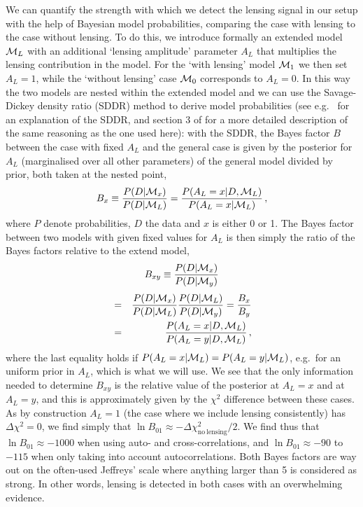 We can quantify the strength with which we detect the lensing signal in our setup with the help of Bayesian model probabilities, comparing the case with lensing to the case without lensing. To do this, we introduce formally an extended model ${\mathcal M}_L$ with an additional `lensing amplitude' parameter $A_L$ that multiplies the lensing contribution in the model. For the `with lensing' model ${\mathcal M}_1$ we then set $A_L = 1$, while the `without lensing' case ${\mathcal M}_0$ corresponds to $A_L=0$. In this way the two models are nested within the extended model and we can use the Savage-Dickey density ratio (SDDR) method to derive model probabilities (see e.g.\ \cite{Trotta:2005ar} for an explanation of the SDDR, and section 3 of \cite{Dirian:2016puz} for a more detailed description of the same reasoning as the one used here): with the SDDR, the Bayes factor $B$ between the case with fixed $A_L$ and the general case is given by the posterior for $A_L$ (marginalised over all other parameters) of the general model divided by prior, both taken at the nested point,
\begin{equation}
B_x \equiv \frac{P(D|{\mathcal M}_x)}{P(D|{\mathcal M}_L)} = \frac{P(A_L=x|D,{\mathcal M}_L)}{P(A_L=x|{\mathcal M}_L)} \, ,
\end{equation}
where $P$ denote probabilities, $D$ the data and $x$ is either 0 or 1.
The Bayes factor between two models with given fixed values for $A_L$ is then simply the ratio of the Bayes factors relative to the extend model, 
\begin{equation}
B_{xy} \equiv \frac{P(D|{\mathcal M}_x)}{P(D|{\mathcal M}_y)} \nonumber
\end{equation}
\begin{eqnarray}
&=& \frac{P(D|{\mathcal M}_x)}{P(D|{\mathcal M}_L)} \frac{P(D|{\mathcal M}_L)}{P(D|{\mathcal M}_y)} = \frac{B_x}{B_y} \nonumber \\
 &=& \frac{P(A_L=x|D,{\mathcal M}_L)}{P(A_L=y|D,{\mathcal M}_L)} \, ,
\end{eqnarray}
where the last equality holds if $P(A_L=x|{\mathcal M}_L)=P(A_L=y|{\mathcal M}_L)$, e.g.\ for an uniform prior in $A_L$, which is what we will use. We see that the only information needed to determine $B_{xy}$ is the relative value of the posterior at $A_L=x$ and at $A_L=y$, and this is approximately given by the $\chi^2$ difference between these cases. As by construction $A_L=1$ (the case where we include lensing consistently) has $\Delta\chi^2=0$, we find simply that $\ln B_{01} \approx -\Delta\chi^2_{\mathrm{no~lensing}}/2$. We find thus that $\ln B_{01} \approx -1000$ when using auto- and cross-correlations, and $\ln B_{01} \approx -90$ to $-115$ when only taking into account autocorrelations. Both Bayes factors are way out on the often-used Jeffreys' scale \cite{Jeffreys:1939xee} where anything larger than 5 is considered as strong. In other words, lensing is detected in both cases with an overwhelming evidence.

